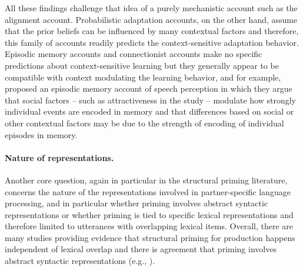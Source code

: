 
All these findings challenge that idea of a purely mechanistic account such as the alignment account. Probabilistic adaptation accounts, on the other hand, assume
that the prior beliefs can be influenced by many contextual factors and therefore, this family of accounts readily predicts the context-sensitive adaptation behavior.
Episodic memory accounts and connectionist accounts make no specific predictions about context-sensitive learning but they generally appear to be compatible with context
modulating the learning behavior, and for example, \cite{SumnerKataoka2013, Sumner2014} proposed an episodic memory account of speech perception in which they argue
 that social factors -- such as attractiveness in the \cite{Babel2012}  study -- modulate how strongly individual events are encoded in memory and that differences based on social
 or other contextual factors may be due to the strength of encoding of individual episodes in memory.
 
\paragraph{Nature of representations.} Another core question, again in particular in the structural priming literature, concerns
the nature of the representations involved in partner-specific language processing, 
and in particular whether priming involves abstract syntactic representations
or whether priming is tied to specific lexical representations and therefore limited to utterances with overlapping lexical items. 
Overall, there are many studies
providing evidence that structural priming for production happens independent of lexical overlap and there is agreement
that priming involves abstract syntactic representations (e.g., \cite{Bock1986,PickeringBranigan1998,HartsuikerEtAl2008}).

